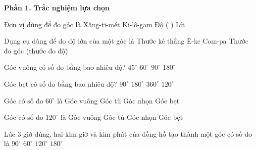 \textbf{Phần 1. Trắc nghiệm lựa chọn}

\begin{ex} %
Đơn vị dùng để đo góc là
\choice
{Xăng-ti-mét}
{Ki-lô-gam}
{\True Độ ($^\circ$)}
{Lít}
\end{ex}

\begin{ex} %
Dụng cụ dùng để đo độ lớn của một góc là
\choice
{Thước kẻ thẳng}
{Ê-ke}
{Com-pa}
{\True Thước đo góc (thước đo độ)}
\end{ex}

\begin{ex} %
Góc vuông có số đo bằng bao nhiêu độ?
\choice
{$45^\circ$}
{$60^\circ$}
{\True $90^\circ$}
{$180^\circ$}
\end{ex}

\begin{ex} %
Góc bẹt có số đo bằng bao nhiêu độ?
\choice
{$90^\circ$}
{\True $180^\circ$}
{$360^\circ$}
{$120^\circ$}
\end{ex}

\begin{ex} %
Góc có số đo $60^\circ$ là
\choice
{Góc vuông}
{Góc tù}
{\True Góc nhọn}
{Góc bẹt}
\end{ex}

\begin{ex} %
Góc có số đo $120^\circ$ là
\choice
{Góc vuông}
{\True Góc tù}
{Góc nhọn}
{Góc bẹt}
\end{ex}

\begin{ex} %
Lúc 3 giờ đúng, hai kim giờ và kim phút của đồng hồ tạo thành một góc có số đo là
\choice
{\True $90^\circ$}
{$60^\circ$}
{$120^\circ$}
{$180^\circ$}
\end{ex}


